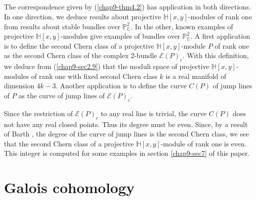 \subsection{}\label{chap9-sec4.5}
The correspondence given by (\ref{chap9-thm4.2}) has application in
both directions. In one direction, we deduce results about projective
$\mathbb{H}[x,y]$-modules of rank one from results about stable
bundles over $\mathbb{P}^{2}_{\mathbb{C}}$. In the other, known
examples of projective $\mathbb{H}[x,y]$-modules give examples of
bundles over $\mathbb{P}^{2}_{\mathbb{C}}$. A first application is to
define the second Chern class of a projective $\mathbb{H}[x,y]$-module
$P$ of rank one as the second Chern class of the complex 2-bundle
$\mathscr{E}(P)_{c}$. With this definition, we deduce from
(\ref{chap9-sec2.9}) that the moduli space of projective
$\mathbb{H}[x,y]$-modules of rank one with fixed second Chern class
$k$ is a real manifold of dimension $4k-3$. Another application is to
define the curve $C(P)$ of jump lines of $P$ as the curve of jump
lines of $\mathscr{E}(P)_{c}$. 

Since the restriction of $\mathscr{E}(P)_{c}$ to any real line is
trivial, the curve $C(P)$ does not have any real closed points. Thus
its degree must be even. Since, by a result of
Barth \cite{chap9-key11}, the degree of the curve of jump lines is the
second Chern class, we see that the second Chern class of a projective
$\mathbb{H}[x,y]$-module of rank one is even. This integer is computed
for some examples in section \ref{chap9-sec7} of this paper. 

\section{Galois cohomology}\label{chap9-sec5}

\subsection{}\label{chap9-sec5.1}

